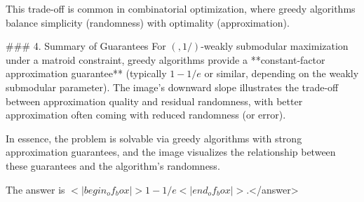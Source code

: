 This trade-off is common in combinatorial optimization, where greedy algorithms balance simplicity (randomness) with optimality (approximation).  


### 4. Summary of Guarantees  
For \((,1/)\)-weakly submodular maximization under a matroid constraint, greedy algorithms provide a **constant-factor approximation guarantee** (typically \( 1 - 1/e \) or similar, depending on the weakly submodular parameter). The image’s downward slope illustrates the trade-off between approximation quality and residual randomness, with better approximation often coming with reduced randomness (or error).  


In essence, the problem is solvable via greedy algorithms with strong approximation guarantees, and the image visualizes the relationship between these guarantees and the algorithm’s randomness.  

The answer is \(<|begin_of_box|>1 - 1/e<|end_of_box|>\).</answer>